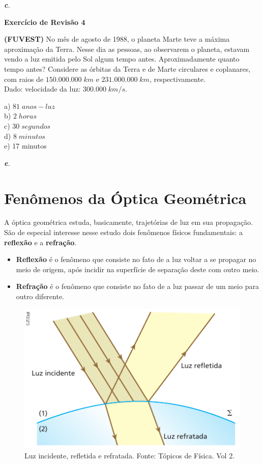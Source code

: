 \documentclass[11pt,twocolumn,oneside]{article}
\newenvironment{resposta*}
  {\bf Resposta:\\ }
  {}
\begin{document}
\begin{resposta*}
{\it \textbf{c}.}
\end{resposta*}

\textbf{Exercício de Revisão 4}


\textbf{(FUVEST)} No mês de agosto de 1988, o planeta Marte teve a máxima aproximação da Terra. Nesse dia as pessoas, ao observarem o planeta, estavam vendo a luz emitida pelo Sol algum tempo antes. Aproximadamente quanto tempo antes? Considere as órbitas da Terra e de Marte circulares e coplanares, com raios de $150.000.000\;km$ e $231.000.000\;km$, respectivamente. \\
Dado: velocidade da luz: $300.000\;km/s$.


a) $81\;anos-luz$ \\
b) $2\;horas$ \\
c) $30\;segundos$ \\
d) $8\;minutos$ \\
e) 17 minutos


\begin{resposta*}
{\it \textbf{e}.}
\end{resposta*}

\hypertarget{x-fenômenos-da-óptica-geométrica}{\section{Fenômenos da Óptica Geométrica}}
A óptica geométrica estuda, basicamente, trajetórias de luz em sua propagação. São de especial interesse nesse estudo dois fenômenos físicos fundamentais: a \textbf{reflexão} e a \textbf{refração}.


\begin{itemize}

\item \textbf{Reflexão} é o fenômeno que consiste no fato de a luz voltar a se propagar no meio de origem, após incidir na superfície de separação deste com outro meio.

\item \textbf{Refração} é o fenômeno que consiste no fato de a luz passar de um meio para outro diferente.

\end{itemize}


\begin{figure}[h]{}
\centering\includegraphics[width=2.5truein]{img7.png}
\caption{Luz incidente, refletida e refratada. Fonte: Tópicos de Física. Vol 2.}
\centering
\end{figure}
\end{document}
